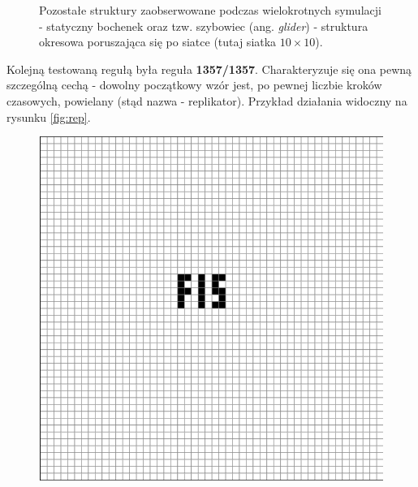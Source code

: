 \documentclass[12pt] {article}
\begin{document}
\begin{figure}[H]
\begin{minipage}[t]{.3\textwidth}
        \label{fig:o3}
    \end{minipage}
    \caption{Pozostałe struktury zaobserwowane podczas wielokrotnych symulacji - statyczny bochenek oraz tzw. szybowiec (ang. \textit{glider}) - struktura okresowa poruszająca się po siatce (tutaj siatka $10\times10$).}
    \label{fig:other}
\end{figure}

\newpage

Kolejną testowaną regułą była reguła \textbf{1357/1357}. Charakteryzuje się ona pewną szczególną cechą - dowolny początkowy wzór jest, po pewnej liczbie kroków czasowych, powielany (stąd nazwa - replikator). Przykład działania widoczny na rysunku \ref{fig:rep}.


\begin{figure}[H]
    \begin{minipage}[t]{.3\textwidth}
        \centering
        \includegraphics[width=\textwidth]{res/rep2.png}
        \label{fig:r4}
    \end{minipage}
    \hfill
    \begin{minipage}[t]{.3\textwidth}
        \centering

\end{minipage}
\end{figure}
\end{document}
